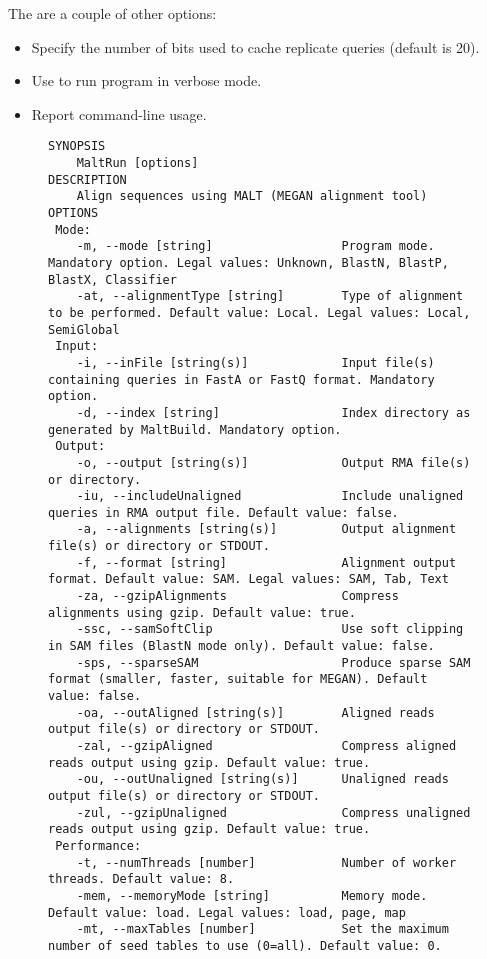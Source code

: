 \documentclass[11pt]{article}
\begin{document}
The are a couple of other options:
\begin{itemize}
\setlength{\itemindent}{30pt}
\item[\itt{--replicateQueryCacheBits}] Specify the number of bits used to cache replicate queries (default is 20).
\item[\itt{--verbose}] Use to run program in verbose mode.
\item[\itt{--help}] Report command-line usage.
\end{itemize}

 \begin{figure}[h]
{\tiny
\begin{verbatim}
SYNOPSIS
	MaltRun [options]
DESCRIPTION
	Align sequences using MALT (MEGAN alignment tool)
OPTIONS
 Mode:
	-m, --mode [string]                  Program mode. Mandatory option. Legal values: Unknown, BlastN, BlastP, BlastX, Classifier
	-at, --alignmentType [string]        Type of alignment to be performed. Default value: Local. Legal values: Local, SemiGlobal
 Input:
	-i, --inFile [string(s)]             Input file(s) containing queries in FastA or FastQ format. Mandatory option.
	-d, --index [string]                 Index directory as generated by MaltBuild. Mandatory option.
 Output:
	-o, --output [string(s)]             Output RMA file(s) or directory. 
	-iu, --includeUnaligned              Include unaligned queries in RMA output file. Default value: false.
	-a, --alignments [string(s)]         Output alignment file(s) or directory or STDOUT. 
	-f, --format [string]                Alignment output format. Default value: SAM. Legal values: SAM, Tab, Text
	-za, --gzipAlignments                Compress alignments using gzip. Default value: true.
	-ssc, --samSoftClip                  Use soft clipping in SAM files (BlastN mode only). Default value: false.
	-sps, --sparseSAM                    Produce sparse SAM format (smaller, faster, suitable for MEGAN). Default value: false.
	-oa, --outAligned [string(s)]        Aligned reads output file(s) or directory or STDOUT. 
	-zal, --gzipAligned                  Compress aligned reads output using gzip. Default value: true.
	-ou, --outUnaligned [string(s)]      Unaligned reads output file(s) or directory or STDOUT. 
	-zul, --gzipUnaligned                Compress unaligned reads output using gzip. Default value: true.
 Performance:
	-t, --numThreads [number]            Number of worker threads. Default value: 8.
	-mem, --memoryMode [string]          Memory mode. Default value: load. Legal values: load, page, map
	-mt, --maxTables [number]            Set the maximum number of seed tables to use (0=all). Default value: 0.

\end{verbatim}}
\end{figure}
\end{document}
